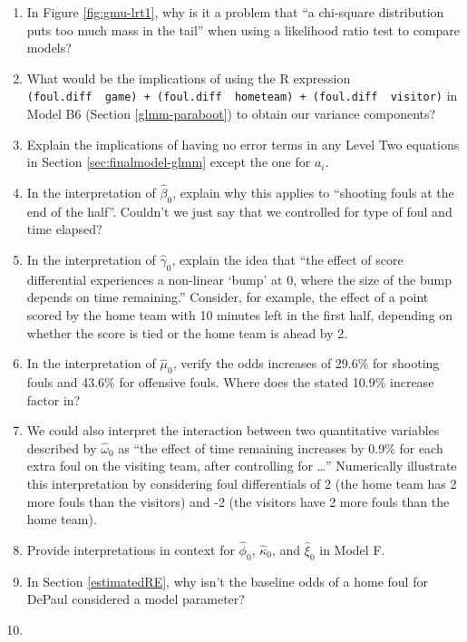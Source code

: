 \documentclass[
]{krantz}
\begin{document}
\begin{enumerate}
\item
  In Figure \ref{fig:gmu-lrt1}, why is it a problem that ``a chi-square distribution puts too much mass in the tail'' when using a likelihood ratio test to compare models?
\item
  What would be the implications of using the R expression \texttt{(foul.diff\ \textbar{}\ game)\ +\ (foul.diff\ \textbar{}\ hometeam)\ +\ (foul.diff\ \textbar{}\ visitor)} in Model B6 (Section \ref{glmm-paraboot}) to obtain our variance components?
\item
  Explain the implications of having no error terms in any Level Two equations in Section \ref{sec:finalmodel-glmm} except the one for \(a_{i}\).
\item
  In the interpretation of \(\hat{\beta}_{0}\), explain why this applies to ``shooting fouls at the end of the half''. Couldn't we just say that we controlled for type of foul and time elapsed?
\item
  In the interpretation of \(\hat{\gamma}_{0}\), explain the idea that ``the effect of score differential experiences a non-linear `bump' at 0, where the size of the bump depends on time remaining.'' Consider, for example, the effect of a point scored by the home team with 10 minutes left in the first half, depending on whether the score is tied or the home team is ahead by 2.
\item
  In the interpretation of \(\hat{\mu}_{0}\), verify the odds increases of 29.6\% for shooting fouls and 43.6\% for offensive fouls. Where does the stated 10.9\% increase factor in?
\item
  We could also interpret the interaction between two quantitative variables described by \(\hat{\omega}_{0}\) as ``the effect of time remaining increases by 0.9\% for each extra foul on the visiting team, after controlling for \ldots{}'' Numerically illustrate this interpretation by considering foul differentials of 2 (the home team has 2 more fouls than the visitors) and -2 (the visitors have 2 more fouls than the home team).
\item
  Provide interpretations in context for \(\hat{\phi}_{0}\), \(\hat{\kappa}_{0}\), and \(\hat{\xi}_{0}\) in Model F.
\item
  In Section \ref{estimatedRE}, why isn't the baseline odds of a home foul for DePaul considered a model parameter?
\item

\end{enumerate}
\end{document}
